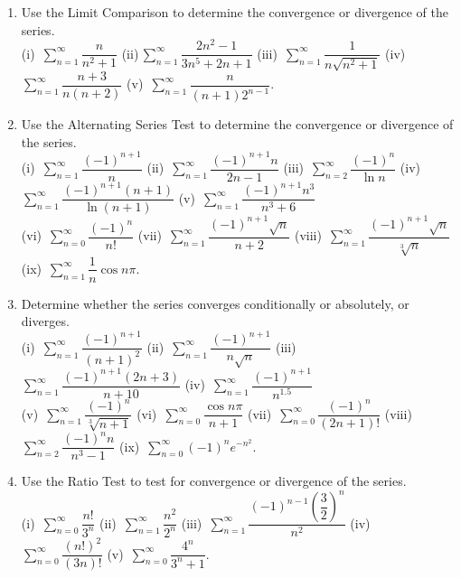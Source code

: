 \documentclass[titlepage,a4paper,12pt]{report}
\begin{document}
\begin{enumerate}
\item Use the Limit Comparison to determine the convergence or divergence of the series.\\
(i)\, $\displaystyle \sum _{n=1}^\infty \dfrac{n}{n^2+1}$ \quad (ii)\,$\displaystyle \sum _{n=1}^\infty \dfrac{2n^2-1}{3n^5+2n+1}$ \quad (iii)\, $\displaystyle \sum _{n=1}^\infty \dfrac{1}{n\sqrt{n^2+1}}$  \quad (iv)\, $\displaystyle \sum _{n=1}^\infty \dfrac{n+3}{n(n+2)}$ \quad (v)\, $\displaystyle \sum _{n=1}^\infty \dfrac{n}{(n+1)2^{n-1}}$.
\item Use the Alternating Series Test to determine the convergence or divergence of the series.\\
(i)\, $\displaystyle \sum _{n=1}^\infty \dfrac{(-1)^{n+1}}{n}$ \quad (ii)\, $\displaystyle \sum _{n=1}^\infty \dfrac{(-1)^{n+1}n}{2n-1}$ \quad (iii)\, $\displaystyle \sum _{n=2}^\infty \dfrac{(-1)^{n}}{\ln n}$ \quad (iv)\, $\displaystyle \sum _{n=1}^\infty \dfrac{(-1)^{n+1}(n+1)}{\ln (n+1)}$ \quad (v)\, $\displaystyle \sum _{n=1}^\infty \dfrac{(-1)^{n+1}n^3}{n^3+6}$\\
(vi)\, $\displaystyle \sum _{n=0}^\infty \dfrac{(-1)^{n}}{n!}$ \quad (vii)\, $\displaystyle \sum _{n=1}^\infty \dfrac{(-1)^{n+1}\sqrt{n}}{n+2}$ \quad (viii)\, $\displaystyle \sum _{n=1}^\infty \dfrac{(-1)^{n+1}\sqrt{n}}{\sqrt[3]{n}}$ \quad (ix)\, $\displaystyle \sum _{n=1}^\infty \dfrac{1}{n}\cos n\pi$.
\item Determine whether the series converges conditionally or absolutely, or diverges.\\
(i)\, $\displaystyle \sum _{n=1}^\infty \dfrac{(-1)^{n+1}}{(n+1)^2}$ \quad (ii)\, $\displaystyle \sum _{n=1}^\infty \dfrac{(-1)^{n+1}}{n\sqrt{n}}$ \quad (iii)\, $\displaystyle \sum _{n=1}^\infty \dfrac{(-1)^{n+1}(2n+3)}{n+10}$ \quad (iv)\, $\displaystyle \sum _{n=1}^\infty \dfrac{(-1)^{n+1}}{n^{1.5}}$ \\ (v)\, $\displaystyle \sum _{n=1}^\infty \dfrac{(-1)^{n}}{\sqrt[3]{n+1}}$ \quad (vi)\, $\displaystyle \sum _{n=0}^\infty \dfrac{\cos n\pi}{n+1}$ \quad (vii)\, $\displaystyle \sum _{n=0}^\infty \dfrac{(-1)^{n}}{(2n+1)!}$ \quad (viii)\, $\displaystyle \sum _{n=2}^\infty \dfrac{(-1)^{n}n}{n^3-1}$ \quad (ix)\, $\displaystyle \sum _{n=0}^\infty (-1)^ne^{-n^2}$.
\item Use the Ratio Test to test for convergence or divergence of the series.\\
(i)\, $\displaystyle \sum _{n=0}^\infty \dfrac{n!}{3^n}$ \quad (ii)\,  $\displaystyle \sum _{n=1}^\infty \dfrac{n^2}{2^n}$ \quad (iii)\,  $\displaystyle \sum _{n=1}^\infty \dfrac{(-1)^{n-1}\left(\dfrac{3}{2}\right)^n}{n^2}$ \quad (iv)\,  $\displaystyle \sum _{n=0}^\infty \dfrac{(n!)^2}{(3n)!}$ \quad (v)\,  $\displaystyle \sum _{n=0}^\infty \dfrac{4^n}{3^n+1}$.

\end{enumerate}
\end{document}

